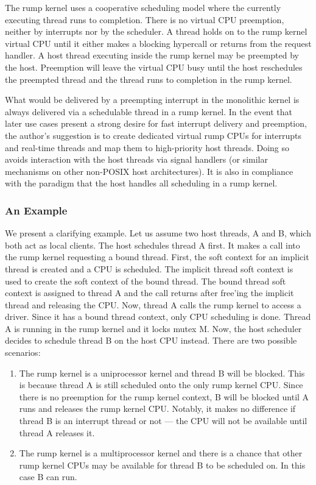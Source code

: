The rump kernel uses a cooperative scheduling model where the
currently executing thread runs to completion.  There is no virtual CPU
preemption, neither by interrupts nor by the scheduler.  A thread holds
on to the rump kernel virtual CPU until it either makes a blocking
hypercall or returns from the request handler.  A host thread
executing inside the rump kernel may be preempted by the host.  Preemption
will leave the virtual CPU busy until the host reschedules the preempted
thread and the thread runs to completion in the rump kernel.

What would be delivered by a preempting interrupt in the monolithic
kernel is always delivered via a schedulable thread in a rump kernel.
In the event that later use cases present a strong desire for fast
interrupt delivery and preemption, the author's suggestion is to
create dedicated virtual rump CPUs for interrupts and real-time
threads and map them to high-priority host threads.  Doing so avoids
interaction with the host threads via signal handlers (or
similar mechanisms on other non-POSIX host architectures).  It is
also in compliance with the paradigm that the host handles all
scheduling in a rump kernel.

\subsubsection{An Example}
\label{sect:lexample}

We present a clarifying example.
Let us assume two host threads, A and B, which both act as local clients.
The host schedules thread A first.  It makes a call into the rump kernel
requesting a bound thread.  First, the soft context for an implicit thread
is created and a CPU is scheduled.  The implicit thread soft context is
used to create the soft context of the bound thread.  The bound thread
soft context is assigned to thread A and the call returns after free'ing
the implicit thread and releasing the CPU.  Now, thread A calls the
rump kernel to access a driver.  Since it has a bound thread context,
only CPU scheduling is done.  Thread A is running in the rump kernel and
it locks mutex M.  Now, the host scheduler decides to schedule thread
B on the host CPU instead.  There are two possible scenarios:

\begin{enumerate}
\item The rump kernel is a uniprocessor kernel and thread B will be blocked.
This is because thread A is still scheduled onto the only rump kernel
CPU.  Since there is no preemption for the rump kernel context, B will
be blocked until A runs and releases the rump kernel CPU.  Notably,
it makes no difference if thread B is an interrupt thread or not ---
the CPU will not be available until thread A releases it.

\item The rump kernel is a multiprocessor kernel and there is a
chance that other rump kernel CPUs may be available for thread B to be
scheduled on.  In this case B can run.
\end{enumerate}

